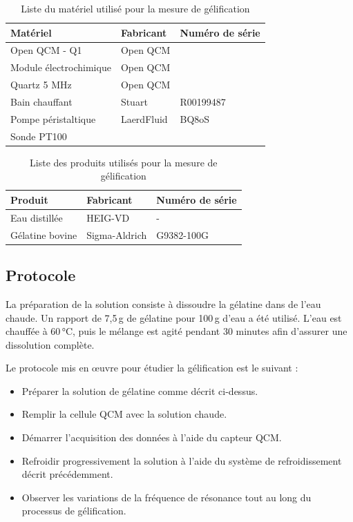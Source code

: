 \begin{table}[H]
    \centering
    \begin{tabular}{|l|l|l|}
        \hline
        \textbf{Matériel}         & \textbf{Fabricant}   & \textbf{Numéro de série} \\
        \hline
        Open QCM - Q1             & Open QCM              &   \\
        Module électrochimique    & Open QCM              &   \\
        Quartz 5 MHz             & Open QCM              &   \\
        Bain chauffant            & Stuart                &  R00199487 \\
        Pompe péristaltique       & LaerdFluid            &  BQ8oS \\
        Sonde PT100               &                       &   \\
        \hline
    \end{tabular}
    \caption{Liste du matériel utilisé pour la mesure de gélification}
\end{table}

\begin{table}[H]
    \centering
    \begin{tabular}{|l|l|l|}
        \hline
        \textbf{Produit} & \textbf{Fabricant}   & \textbf{Numéro de série} \\
        \hline
        Eau distillée    & HEIG-VD              &   -           \\
        Gélatine bovine  & Sigma-Aldrich        &   G9382-100G  \\
        \hline
    \end{tabular}
    \caption{Liste des produits utilisés pour la mesure de gélification}
\end{table}

\subsection{Protocole}

La préparation de la solution consiste à dissoudre la gélatine dans de l’eau chaude. Un rapport de 7,5 g de gélatine pour 100 g d’eau a été utilisé. L’eau est chauffée à 60 °C, puis le mélange est agité pendant 30 minutes afin d’assurer une dissolution complète.

Le protocole mis en œuvre pour étudier la gélification est le suivant :
\begin{itemize}
    \item Préparer la solution de gélatine comme décrit ci-dessus.
    \item Remplir la cellule QCM avec la solution chaude.
    \item Démarrer l’acquisition des données à l’aide du capteur QCM.
    \item Refroidir progressivement la solution à l’aide du système de refroidissement décrit précédemment.
    \item Observer les variations de la fréquence de résonance tout au long du processus de gélification.
\end{itemize}

